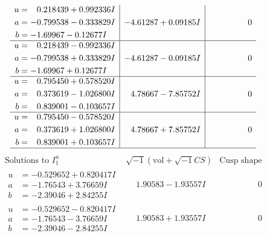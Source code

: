 \documentclass[1p]{elsarticle_modified}
\theoremstyle{definition}
\newcommand{\I}{\sqrt{-1}}
\begin{document}
$$\begin{array}{c|c|c}
\begin{aligned}
u &= \phantom{-}0.218439 + 0.992336 I \\
a &= -0.799538 - 0.333829 I \\
b &= -1.69967 - 0.12677 I\end{aligned}
 & -4.61287 + 0.09185 I & \phantom{-0.000000 } 0 \\ \hline\begin{aligned}
u &= \phantom{-}0.218439 - 0.992336 I \\
a &= -0.799538 + 0.333829 I \\
b &= -1.69967 + 0.12677 I\end{aligned}
 & -4.61287 - 0.09185 I & \phantom{-0.000000 } 0 \\ \hline\begin{aligned}
u &= \phantom{-}0.795450 + 0.578520 I \\
a &= \phantom{-}0.373619 - 1.026800 I \\
b &= \phantom{-}0.839001 - 0.103657 I\end{aligned}
 & \phantom{-}4.78667 - 7.85752 I & \phantom{-0.000000 } 0 \\ \hline\begin{aligned}
u &= \phantom{-}0.795450 - 0.578520 I \\
a &= \phantom{-}0.373619 + 1.026800 I \\
b &= \phantom{-}0.839001 + 0.103657 I\end{aligned}
 & \phantom{-}4.78667 + 7.85752 I & \phantom{-0.000000 } 0\\
 \hline 
 \end{array}$$\newpage$$\begin{array}{c|c|c}  
\text{Solutions to }I^u_{1}& \I (\text{vol} + \sqrt{-1}CS) & \text{Cusp shape}\\
 \hline 
\begin{aligned}
u &= -0.529652 + 0.820417 I \\
a &= -1.76543 + 3.76659 I \\
b &= -2.39046 + 2.84255 I\end{aligned}
 & \phantom{-}1.90583 - 1.93557 I & \phantom{-0.000000 } 0 \\ \hline\begin{aligned}
u &= -0.529652 - 0.820417 I \\
a &= -1.76543 - 3.76659 I \\
b &= -2.39046 - 2.84255 I\end{aligned}
 & \phantom{-}1.90583 + 1.93557 I & \phantom{-0.000000 } 0 \\ \hline\begin{aligned}

\end{aligned}
\end{array}$$
\end{document}
